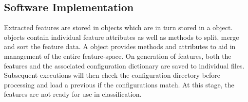     \subsection{Software Implementation}
    \label{subsec:pl-feats-software}
        Extracted features are stored in  objects which are in turn stored in a  object.  objects contain individual feature attributes as well as methods to split, merge and sort the feature data. A  object provides methods and attributes to aid in management of the entire feature-space. On generation of features, both the features and the associated configuration dictionary are saved to individual files. Subsequent executions will then check the configuration directory before processing and load a previous  if the configurations match. At this stage, the features are not ready for use in classification.  
        
  